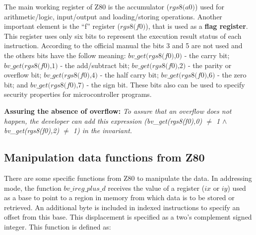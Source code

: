 \documentclass[a4paper]{llncs}
\begin{document}
The main working register of Z80 is the accumulator ($\textit{rgs8(a0)}$) used for arithmetic/logic, input/output and loading/storing operations.
Another important element is the ``f'' register ($\textit{rgs8(f0)}$),  that is
used as a \textbf{flag register}. This register uses only six bits to represent the execution result status of each instruction.
According to the official manual the bits 3 and 5 are not used and the others bits have the follow meaning: $\textit{bv\_get(rgs8(f0),0)}$ - the carry bit; $\textit{bv\_get(rgs8(f0),1)}$ - the add/subtract bit; $\textit{bv\_get(rgs8(f0),2)}$ - the parity or overflow bit; $\textit{bv\_get(rgs8(f0),4)}$ - the half carry bit; 
$\textit{bv\_get(rgs8(f0),6)}$ - the zero bit; and $\textit{bv\_get(rgs8(f0),7)}$ - the sign bit.
These bits also can be used to specify security properties for microcontroller programs.   

\textbf{Assuring the absence of overflow:}
 \emph{To assure that an overflow does not happen, the developer can add this
 expression (\textit{bv\_get(rgs8(f0),0)} $\neq$ 1 $\land$
 \textit{bv\_get(rgs8(f0),2) $\neq$ 1}) in the invariant.
}

\subsection{Manipulation data functions from Z80}

 There are some specific functions from Z80 to manipulate the data. In addressing mode, the function
$\textit{bv\_ireg\_plus\_d}$ receives the value of a register ($\textit{ix}$ or $\textit{iy}$) 
used as a base to point to a region in memory from which data is to be stored or retrieved.
 An additional byte is included in indexed instructions to specify an offset from this base. This displacement is specified as a two's complement signed integer. This function is defined as:
\end{document}
